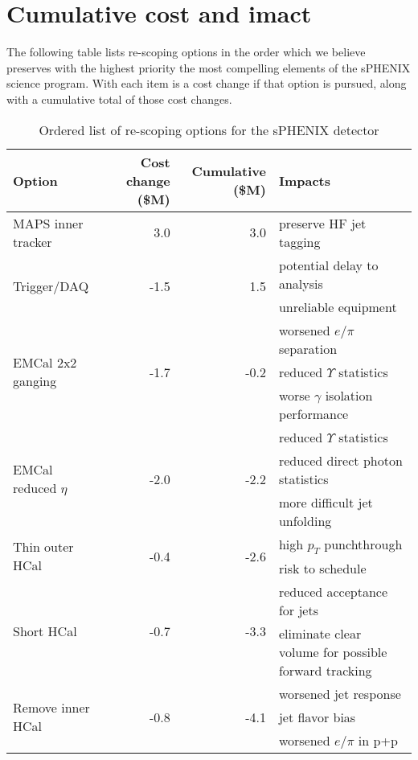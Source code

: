 
\section{Cumulative cost and imact}
\label{sec:cumul-cost-imact}

The following table lists re-scoping options in the order which we
believe preserves with the highest priority the most compelling
elements of the sPHENIX science program.  With each item is a cost
change if that option is pursued, along with a cumulative total of
those cost changes.

\renewcommand{\arraystretch}{1.4}
\begin{table}
  \begin{tabular}{lrrp{2in}}
    \toprule
    Option & Cost change (\$M) & Cumulative (\$M) & Impacts \\
    \midrule
    MAPS inner tracker & 3.0 & 3.0 & preserve HF jet tagging \\
    \midrule
    \multirow{2}{*}{Trigger/DAQ} & \multirow{2}{*}{-1.5} & \multirow{2}{*}{1.5} & potential delay to analysis \\
    & & &  unreliable equipment \\
    \midrule
    \multirow{3}{*}{EMCal 2x2 ganging} & \multirow{3}{*}{-1.7} & \multirow{3}{*}{-0.2}
    & worsened $e/\pi$ separation \\
    & & & reduced $\Upsilon$ statistics \\
    & & & worse $\gamma$ isolation
    performance \\
    \midrule
    \multirow{3}{*}{EMCal reduced $\eta$} & \multirow{3}{*}{-2.0} & \multirow{3}{*}{-2.2} & reduced $\Upsilon$
    statistics \\
    & & &  reduced direct photon statistics \\
    & & & more difficult jet    unfolding \\
    \midrule
    \multirow{2}{*}{Thin outer HCal} & \multirow{2}{*}{-0.4} &
    \multirow{2}{*}{-2.6} & high $p_T$ punchthrough \\
    & & & risk to
    schedule \\
    \midrule
    \multirow{2}{*}{Short HCal} & \multirow{2}{*}{-0.7} & \multirow{2}{*}{-3.3} & reduced acceptance for jets \\
    & & & eliminate clear volume for possible forward tracking \\
    \midrule
    \multirow{3}{*}{Remove inner HCal} & \multirow{3}{*}{-0.8} &
    \multirow{3}{*}{-4.1} & worsened jet response \\ 
    & & & jet flavor bias \\
    & & & worsened $e/\pi$ in p+p \\
    \bottomrule
  \end{tabular}
  \caption{Ordered list of re-scoping options for the sPHENIX detector}
  \label{tab:rescoping_options}
\end{table}